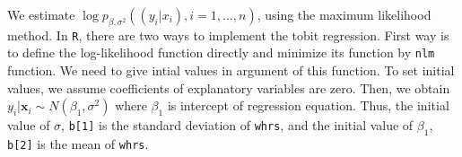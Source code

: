 \documentclass[
  12pt,
]{article}
\newenvironment{Shaded}{\begin{snugshade}}{\end{snugshade}}
\newcommand{\ControlFlowTok}[1]{\textcolor[rgb]{0.13,0.29,0.53}{\textbf{#1}}}
\newcommand{\DecValTok}[1]{\textcolor[rgb]{0.00,0.00,0.81}{#1}}
\newcommand{\KeywordTok}[1]{\textcolor[rgb]{0.13,0.29,0.53}{\textbf{#1}}}
\newcommand{\NormalTok}[1]{#1}
\newcommand{\OperatorTok}[1]{\textcolor[rgb]{0.81,0.36,0.00}{\textbf{#1}}}
\newcommand{\StringTok}[1]{\textcolor[rgb]{0.31,0.60,0.02}{#1}}
\begin{document}
We estimate \(\log p_{\beta, \sigma^2}((y_i | x_i), i = 1, \ldots, n)\), using the maximum likelihood method.
In \texttt{R}, there are two ways to implement the tobit regression.
First way is to define the log-likelihood function directly and minimize its function by \texttt{nlm} function.
We need to give intial values in argument of this function.
To set initial values, we assume coefficients of explanatory variables are zero.
Then, we obtain \(y_i | \mathbf{x}_i \sim N(\beta_1, \sigma^2)\)
where \(\beta_1\) is intercept of regression equation.
Thus, the initial value of \(\sigma\), \texttt{b{[}1{]}} is the standard deviation of \texttt{whrs},
and the initial value of \(\beta_1\), \texttt{b{[}2{]}} is the mean of \texttt{whrs}.

\begin{Shaded}
\end{Shaded}
\end{document}
